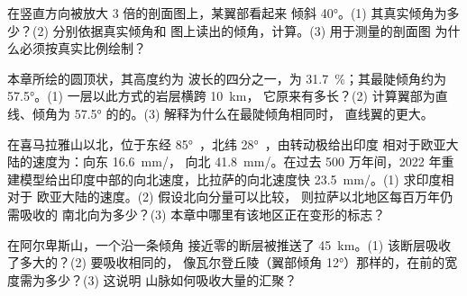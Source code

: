 \begin{exercise}[$\star\star$]\label{exo:g12:mountain-building:11}
在竖直方向被放大 3 倍的剖面图上，某翼部看起来
倾斜 \ang{40}。(1) 其真实倾角为多少？(2) 分别依据真实倾角和
图上读出的倾角，计算。(3) 用于测量的剖面图
为什么必须按真实比例绘制？
\end{exercise}

\begin{exercise}[$\star\star\star$]\label{exo:g12:mountain-building:12}
本章所绘的圆顶状，其高度约为
波长的四分之一，为 \qty{31.7}{\percent}；其最陡倾角约为
\ang{57.5}。(1) 一层以此方式的岩层横跨 \qty{10}{km}，
它原来有多长？(2) 计算翼部为直线、倾角为
\ang{57.5} 的的。(3) 解释为什么在最陡倾角相同时，
直线翼的更大。
\end{exercise}

\begin{exercise}[$\star\star\star$]\label{exo:g12:mountain-building:13}
在喜马拉雅山以北，位于东经 \ang{85}~，北纬 \ang{28}~，由转动极给出印度
相对于欧亚大陆的速度为：向东 \qty{16.6}{mm/}，
向北 \qty{41.8}{mm/}。在过去 500 万年间，2022
年重建模型给出印度中部的向北速度，比拉萨的向北速度快
\qty{23.5}{mm/}。(1) 求印度相对于
欧亚大陆的速度。(2) 假设北向分量可以比较，
则拉萨以北地区每百万年仍需吸收的
南北向为多少？(3) 本章中哪里有该地区正在变形的标志？
\end{exercise}

\begin{exercise}[$\star\star\star$]\label{exo:g12:mountain-building:14}
在阿尔卑斯山，一个沿一条倾角
接近零的断层被推送了 \qty{45}{km}。(1) 该断层吸收了多大的？(2) 要吸收相同的，
像瓦尔登丘陵（翼部倾角
\ang{12}）那样的，在前的宽度需为多少？(3) 这说明
山脉如何吸收大量的汇聚？
\end{exercise}

